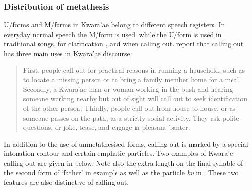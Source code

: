 \subsubsection{Distribution of metathesis}\label{sec:KwaFun}
U\=/forms and M\=/forms in Kwara'ae belong to different speech registers.
In everyday normal speech the M\=/form is used,
while the U\=/form is used in traditional songs,
for clarification \citep[3]{he04}, and when calling out.
\citet[19]{wage86} report that calling out has three main uses in Kwara'ae discourse:

\begin{quote}
First, people call out for practical reasons in running a household,
such as to locate a missing person or to bring a family member home for a meal.
Secondly, a Kwara'ae man or woman working in the bush and hearing someone
working nearby but out of sight will call out to seek identification of the other person.
Thirdly, people call out from house to house, or as someone passes on the path, as a strictly social activity.
They ask polite questions, or joke, tease, and engage in pleasant banter. \hfill\citep{wage86}
\end{quote}

In addition to the use of unmetathesised forms, calling out is marked
by a special intonation contour and certain emphatic particles.
Two examples of Kwara'e calling out are given in  below.
Note also the extra length on the final syllable of the second form of `father' in example
 as well as the particle \emph{ku} in .
These two features are also distinctive of calling out.

\begin{exe}\let\eachwordone=\itshape
	\label{KwCallingOut}
		\begin{xlist}
		\end{xlist}
\end{exe}

